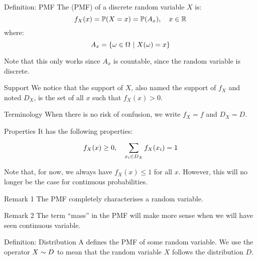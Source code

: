 \documentclass[a4paper]{article}
\begin{document}
\begin{parag}{Definition: PMF}
    The  (PMF) of a discrete random variable $X$ is: 
    \[f_X\left(x\right) = \prob\left(X = x\right) = \prob\left(A_x\right), \mathspace x \in \mathbb{R}\]
    where: 
    \[A_x = \left\{\omega \in \Omega \suchthat X\left(\omega\right) = x\right\}\]
    
    Note that this only works since $A_x$ is countable, since the random variable is discrete.

    \begin{subparag}{Support}
        We notice that the support of $X$, also named the support of $f_X$ and noted $D_X$, is the set of all $x$ such that $f_X\left(x\right) > 0$.
    \end{subparag}

    \begin{subparag}{Terminology}
        When there is no risk of confusion, we write $f_X = f$ and $D_X = D$.
    \end{subparag}
    

    \begin{subparag}{Properties}
        It has the following properties: 
        \[f_X\left(x\right) \geq 0 ,\mathspace \sum_{x_i \in D_X}^{} f_X\left(x_i\right) = 1\]

        Note that, for now, we always have $f_X\left(x\right) \leq 1$ for all $x$. However, this will no longer be the case for continuous probabilities.
    \end{subparag}

    \begin{subparag}{Remark 1}
        The PMF completely characterises a random variable.
    \end{subparag}
    
    \begin{subparag}{Remark 2}
        The term ``mass'' in the PMF will make more sense when we will have seen continuous variable.
    \end{subparag}
\end{parag}

\begin{parag}{Definition: Distribution}
    A  defines the PMF of some random variable. We use the operator $X \sim D$ to mean that the random variable $X$ follows the distribution $D$.
\end{parag}
\end{document}
